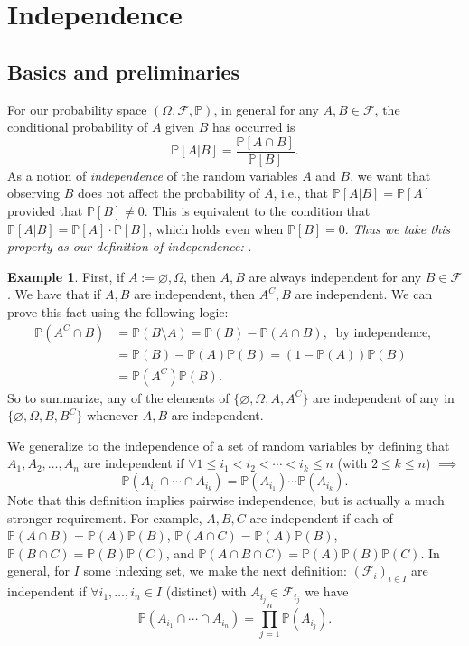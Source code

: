 \documentclass[12pt,reqno]{article}
\renewcommand{\emph}[1]{\textit{#1}}
\theoremstyle{plain}
\theoremstyle{definition}
\newtheorem{example}[theorem]{Example}
\newcommand{\PP}[1]{\ensuremath{\mathbb{P}\left(#1\right)}}
\begin{document}
\newpage 
\section{Independence} 

\subsection{Basics and preliminaries}

For our probability space $(\Omega, \mathcal{F}, \mathbb{P})$, in general for 
any $A,B \in \mathcal{F}$, the conditional probability of $A$ given $B$ has 
occurred is 
\[
\mathbb{P}[A|B] = \frac{\mathbb{P}[A \cap B]}{\mathbb{P}[B]}. 
\]
As a notion of \emph{independence} of the random variables $A$ and $B$, we want that 
observing $B$ does not affect the probability of $A$, i.e., that 
$\mathbb{P}[A|B] = \mathbb{P}[A]$ provided that $\mathbb{P}[B] \neq 0$. 
This is equivalent to the condition that $\mathbb{P}[A|B] = \mathbb{P}[A] \cdot \mathbb{P}[B]$, 
which holds even when $\mathbb{P}[B] = 0$. 
\emph{Thus we take this property as our definition of independence: } 
. 

\begin{example} 
First, if $A := \varnothing,\Omega$, then $A,B$ are always independent for any $B \in \mathcal{F}$. 
We have that if $A,B$ are independent, then $A^C,B$ are independent. We can prove this fact using the 
following logic:
\begin{align*} 
\mathbb{P}(A^C \cap B) & = \mathbb{P}(B \setminus A) = \mathbb{P}(B) - \mathbb{P}(A \cap B),\ 
     \text{ by independence, } \\ 
     & = \mathbb{P}(B) - \mathbb{P}(A) \mathbb{P}(B) = (1-\mathbb{P}(A)) \mathbb{P}(B) \\ 
     & = \mathbb{P}(A^C) \mathbb{P}(B). 
\end{align*} 
So to summarize, any of the elements of $\{\varnothing,\Omega,A,A^C\}$ are independent of any in 
$\{\varnothing,\Omega,B,B^C\}$ whenever $A,B$ are independent. 
\end{example} 
We generalize to the independence of a set of random variables by defining that 
$A_1,A_2,\ldots,A_n$ are independent if $\forall 1 \leq i_1 < i_2 < \cdots < i_k \leq n$ (with 
$2 \leq k \leq n$) $\implies$ 
\[
\mathbb{P}(A_{i_1} \cap \cdots \cap A_{i_k}) = \mathbb{P}(A_{i_1}) \cdots \mathbb{P}(A_{i_k}). 
\]
Note that this definition implies pairwise independence, but is actually a much stronger 
requirement. For example, $A,B,C$ are independent if each of 
$\PP{A \cap B} = \PP{A} \PP{B}$, $\PP{A \cap C} = \PP{A} \PP{B}$, 
$\PP{B \cap C} = \PP{B} \PP{C}$, and $\PP{A \cap B \cap C} = \PP{A} \PP{B} \PP{C}$. 
In general, for $I$ some indexing set, we make the next definition: 
$(\mathcal{F}_i)_{i \in I}$ are independent if $\forall i_1,\ldots,i_n \in I$ (distinct) with 
$A_{i_j} \in \mathcal{F}_{i_j}$ we have 
\[
\PP{A_{i_1} \cap \cdots \cap A_{i_n}} = \prod_{j=1}^n \PP{A_{i_j}}. 
\]
\end{document}
